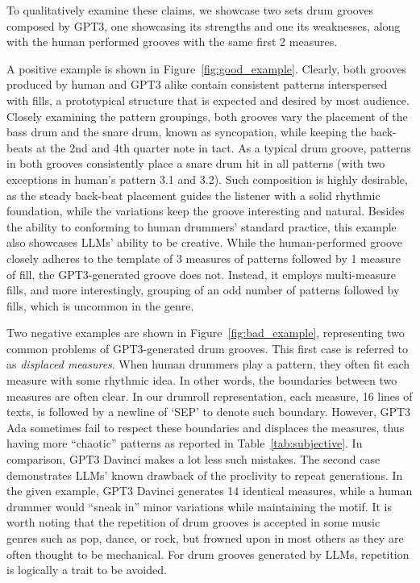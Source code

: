 \documentclass[letterpaper]{article} %
\begin{document}
To qualitatively examine these claims, we showcase two sets drum grooves composed by GPT3, one showcasing its strengths and one its weaknesses, along with the human performed grooves with the same first 2 measures.

A positive example is shown in Figure~\ref{fig:good_example}. Clearly, both grooves produced by human and GPT3 alike contain consistent patterns interspersed with fills, a prototypical structure that is expected and desired by most audience. Closely examining the pattern groupings, both grooves vary the placement of the bass drum and the snare drum, known as syncopation, while keeping the back-beats at the 2nd and 4th quarter note in tact. As a typical drum groove, patterns in both grooves consistently place a snare drum hit in all patterns (with two exceptions in human's pattern 3.1 and 3.2). Such composition is highly desirable, as the steady back-beat placement guides the listener with a solid rhythmic foundation, while the variations keep the groove interesting and natural. Besides the ability to conforming to human drummers' standard practice, this example also showcases LLMs' ability to be creative. While the human-performed groove closely adheres to the template of 3 measures of patterns followed by 1 measure of fill, the GPT3-generated groove does not. Instead, it employs multi-measure fills, and more interestingly, grouping of an odd number of patterns followed by fills, which is uncommon in the genre.

Two negative examples are shown in Figure~\ref{fig:bad_example}, representing two common problems of GPT3-generated drum grooves. This first case is referred to as \textit{displaced measures}. When human drummers play a pattern, they often fit each measure with some rhythmic idea. In other words, the boundaries between two measures are often clear. In our drumroll representation, each measure, 16 lines of texts, is followed by a newline of `SEP' to denote such boundary. However, GPT3 Ada sometimes fail to respect these boundaries and displaces the measures, thus having more ``chaotic'' patterns as reported in Table~\ref{tab:subjective}. In comparison, GPT3 Davinci makes a lot less such mistakes. The second case demonstrates LLMs' known drawback of the proclivity to repeat generations. In the given example, GPT3 Davinci generates 14 identical measures, while a human drummer would ``sneak in'' minor variations while maintaining the motif. It is worth noting that the repetition of drum grooves is accepted in some music genres such as pop, dance, or rock, but frowned upon in most others as they are often thought to be mechanical. For drum grooves generated by LLMs, repetition is logically a trait to be avoided.
\end{document}
